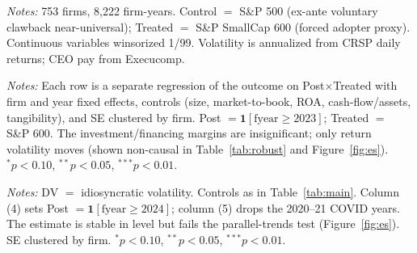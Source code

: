 \documentclass[12pt]{article}
\begin{document}
\FloatBarrier
\newpage
\begin{table}[htbp]\centering
\begin{threeparttable}
\caption{Summary statistics, main DiD sample (S\&P 500 vs.\ S\&P 600, 2015--2025)}
\label{tab:sumstats}\footnotesize

\begin{tablenotes}\small\item \textit{Notes:} 753 firms, 8{,}222 firm-years. Control $=$ S\&P
500 (ex-ante voluntary clawback near-universal); Treated $=$ S\&P SmallCap 600 (forced adopter
proxy). Continuous variables winsorized 1/99. Volatility is annualized from CRSP daily returns;
CEO pay from Execucomp.
\end{tablenotes}
\end{threeparttable}
\end{table}

\begin{table}[htbp]\centering
\begin{threeparttable}
\caption{Difference-in-differences across risk-taking outcomes (preferred specification)}
\label{tab:main}\small

\begin{tablenotes}\small\item \textit{Notes:} Each row is a separate regression of the outcome
on Post$\times$Treated with firm and year fixed effects, controls (size, market-to-book, ROA,
cash-flow/assets, tangibility), and SE clustered by firm. Post $=\mathbf{1}[\text{fyear}\geq
2023]$; Treated $=$ S\&P 600. The investment/financing margins are insignificant; only return
volatility moves (shown non-causal in Table~\ref{tab:robust} and Figure~\ref{fig:es}).
$^{*}p<0.10$, $^{**}p<0.05$, $^{***}p<0.01$.
\end{tablenotes}
\end{threeparttable}
\end{table}

\begin{table}[htbp]\centering
\begin{threeparttable}
\caption{Progressive specifications, headline outcome (idiosyncratic volatility)}
\label{tab:prog}\footnotesize

\begin{tablenotes}\small\item \textit{Notes:} DV $=$ idiosyncratic volatility. Controls as in
Table~\ref{tab:main}. Column (4) sets Post $=\mathbf{1}[\text{fyear}\geq 2024]$; column (5)
drops the 2020--21 COVID years. The estimate is stable in level but fails the parallel-trends
test (Figure~\ref{fig:es}). SE clustered by firm. $^{*}p<0.10$, $^{**}p<0.05$, $^{***}p<0.01$.
\end{tablenotes}
\end{threeparttable}
\end{table}
\end{document}
